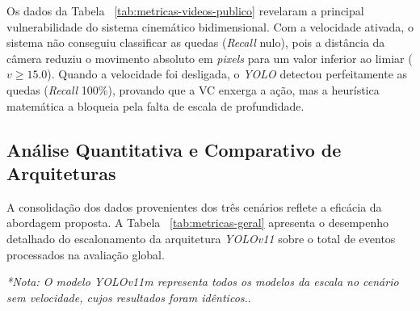\documentclass[12pt]{article}
\begin{document}
Os dados da Tabela ~\ref{tab:metricas-videos-publico} revelaram a principal vulnerabilidade do sistema cinemático
bidimensional. Com a velocidade ativada, o sistema não conseguiu classificar as quedas (\textit{Recall} nulo), pois
a distância da câmera reduziu o movimento absoluto em \textit{pixels} para um valor inferior ao limiar ($ v \ge 15.0$).
Quando a velocidade foi desligada, o \textit{YOLO} detectou perfeitamente as quedas (\textit{Recall} 100\%), provando
que a VC enxerga a ação, mas a heurística matemática a bloqueia pela falta de escala de profundidade.

\subsection{Análise Quantitativa e Comparativo de Arquiteturas}

A consolidação dos dados provenientes dos três cenários reflete a eficácia da abordagem proposta. 
A Tabela ~\ref{tab:metricas-geral} apresenta o desempenho detalhado do escalonamento da arquitetura
\textit{YOLOv11} sobre o total de eventos processados na avaliação global.

\begin{table}[ht!]
\centering
\small
\caption{Comparativo geral de métricas: Cenários com e sem limitador cinemático.}
\label{tab:metricas-geral}
\textit{*Nota: O modelo YOLOv11m representa todos os modelos da escala no cenário sem velocidade,
cujos resultados foram idênticos.}.
\end{table}
\end{document}
